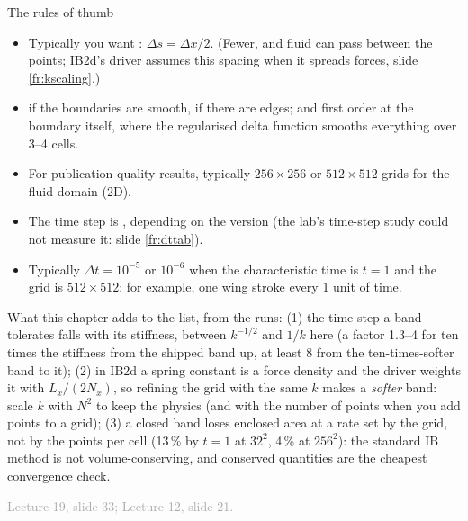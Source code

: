\documentclass[aspectratio=169,11pt]{beamer}
\newcommand{\sourcecredit}[1]{\vfill\hfill{\tiny\textcolor{DarkGray}{#1}}}
\begin{document}
\begin{frame}{The rules of thumb}
\label{fr:rules}
\footnotesize
\begin{itemize}
  \item Typically you want : $\Delta s = \Delta x/2$. (Fewer, and fluid can pass between the points; IB2d's driver assumes this spacing when it spreads forces, slide \ref{fr:kscaling}.)
  \item {} if the boundaries are smooth,  if there are edges; and first order at the boundary itself, where the regularised delta function smooths everything over 3--4 cells.
  \item For publication-quality results, typically $256 \times 256$ or $512 \times 512$ grids for the fluid domain (2D).
  \item The time step is , depending on the version (the lab's time-step study could not measure it: slide \ref{fr:dttab}).
  \item Typically $\Delta t = 10^{-5}$ or $10^{-6}$ when the characteristic time is $t = 1$ and the grid is $512 \times 512$: for example, one wing stroke every 1 unit of time.
\end{itemize}
\begin{punchbox}
\footnotesize What this chapter adds to the list, from the runs: (1) the time step a band tolerates falls with its stiffness, between $k^{-1/2}$ and $1/k$ here (a factor 1.3--4 for ten times the stiffness from the shipped band up, at least 8 from the ten-times-softer band to it); (2) in IB2d a spring constant is a force density and the driver weights it with $L_x/(2N_x)$, so refining the grid with the same $k$ makes a \emph{softer} band: scale $k$ with $N^2$ to keep the physics (and with the number of points when you add points to a grid); (3) a closed band loses enclosed area at a rate set by the grid, not by the points per cell (13\,\% by $t = 1$ at $32^2$, 4\,\% at $256^2$): the standard IB method is not volume-conserving, and conserved quantities are the cheapest convergence check.
\end{punchbox}
\sourcecredit{Lecture 19, slide 33; Lecture 12, slide 21.}
\end{frame}
\end{document}
